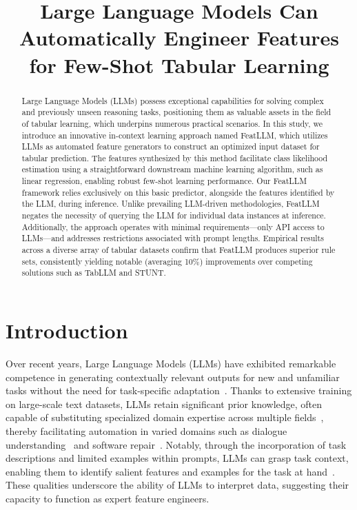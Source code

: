 \title{Large Language Models Can Automatically Engineer Features for Few-Shot Tabular Learning}

\begin{abstract}
Large Language Models (LLMs) possess exceptional capabilities for solving complex and previously unseen reasoning tasks, positioning them as valuable assets in the field of tabular learning, which underpins numerous practical scenarios. In this study, we introduce an innovative in-context learning approach named \textsf{FeatLLM}, which utilizes LLMs as automated feature generators to construct an optimized input dataset for tabular prediction. The features synthesized by this method facilitate class likelihood estimation using a straightforward downstream machine learning algorithm, such as linear regression, enabling robust few-shot learning performance. Our \textsf{FeatLLM} framework relies exclusively on this basic predictor, alongside the features identified by the LLM, during inference. Unlike prevailing LLM-driven methodologies, \textsf{FeatLLM} negates the necessity of querying the LLM for individual data instances at inference. Additionally, the approach operates with minimal requirements—only API access to LLMs—and addresses restrictions associated with prompt lengths. Empirical results across a diverse array of tabular datasets confirm that \textsf{FeatLLM} produces superior rule sets, consistently yielding notable (averaging 10\%) improvements over competing solutions such as TabLLM and STUNT.
\end{abstract}

\section{Introduction}
Over recent years, Large Language Models (LLMs) have exhibited remarkable competence in generating contextually relevant outputs for new and unfamiliar tasks without the need for task-specific adaptation~\cite{creswell2022selection,imani2023mathprompter,taylor2022galactica}. Thanks to extensive training on large-scale text datasets, LLMs retain significant prior knowledge, often capable of substituting specialized domain expertise across multiple fields~\cite{Genomes2021,singhal2023large,wilcox2003role}, thereby facilitating automation in varied domains such as dialogue understanding~\cite{finch2023leveraging} and software repair~\cite{fan2023automated}. Notably, through the incorporation of task descriptions and limited examples within prompts, LLMs can grasp task context, enabling them to identify salient features and examples for the task at hand~\cite{brown2020language,zhao2023survey}. These qualities underscore the ability of LLMs to interpret data, suggesting their capacity to function as expert feature engineers.

